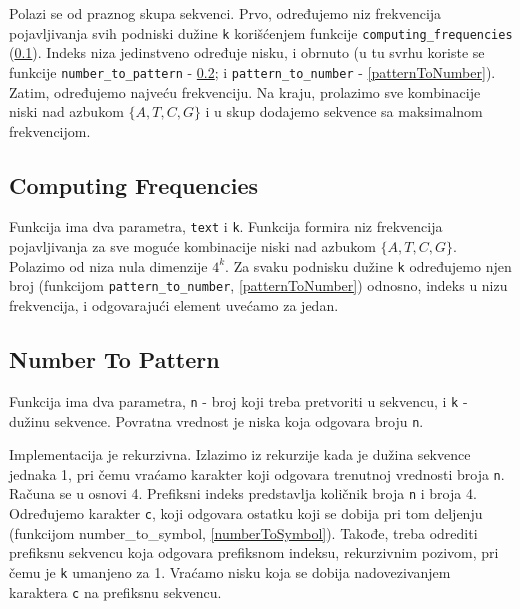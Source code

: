 Polazi se od praznog skupa sekvenci. Prvo, određujemo niz frekvencija pojavljivanja svih podniski dužine \texttt{k} korišćenjem funkcije \texttt{computing\_frequencies} (\ref{computingFrequencies}). Indeks niza jedinstveno određuje nisku, i obrnuto (u tu svrhu koriste se funkcije \texttt{number\_to\_pattern} - \ref{numberToPattern}; i \texttt{pattern\_to\_number} - \ref{patternToNumber}). Zatim, određujemo najveću frekvenciju. Na kraju, prolazimo sve kombinacije niski nad azbukom $\{A, T, C, G\}$ i u skup dodajemo sekvence sa maksimalnom frekvencijom.

 


\subsection{Computing Frequencies}
\label{computingFrequencies}

Funkcija ima dva parametra, \texttt{text} i \texttt{k}. Funkcija formira niz frekvencija pojavljivanja za sve moguće kombinacije niski nad azbukom $\{A, T, C, G\}$.
Polazimo od niza nula dimenzije $4^k$. Za svaku podnisku dužine \texttt{k} određujemo njen broj (funkcijom \texttt{pattern\_to\_number}, \ref{patternToNumber}) odnosno, indeks u nizu frekvencija, i odgovarajući element uvećamo za jedan.

 


\subsection{Number To Pattern}
\label{numberToPattern}

Funkcija ima dva parametra, \texttt{n} - broj koji treba pretvoriti u sekvencu, i \texttt{k} - dužinu sekvence. Povratna vrednost je niska koja odgovara broju \texttt{n}.

Implementacija je rekurzivna. Izlazimo iz rekurzije kada je dužina sekvence jednaka 1, pri čemu vraćamo karakter koji odgovara trenutnoj vrednosti broja \texttt{n}. Računa se u osnovi 4. Prefiksni indeks predstavlja količnik broja \texttt{n} i broja 4. Određujemo karakter \texttt{c}, koji odgovara ostatku koji se dobija pri tom deljenju (funkcijom number\_to\_symbol, \ref{numberToSymbol}). Takođe, treba odrediti prefiksnu sekvencu koja odgovara prefiksnom indeksu, rekurzivnim pozivom, pri čemu je \texttt{k} umanjeno za 1. Vraćamo nisku koja se dobija nadovezivanjem karaktera \texttt{c} na prefiksnu sekvencu.


